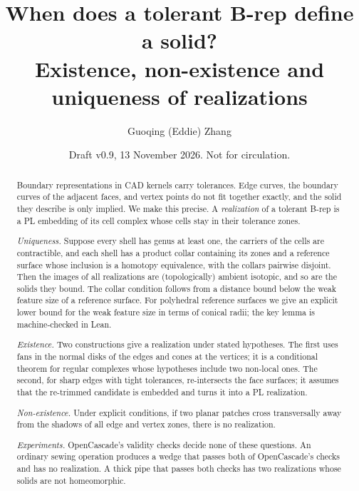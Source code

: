 \documentclass[11pt]{amsart}
\title[Realizations of tolerant B-reps]{When does a tolerant B-rep define a solid?\\
Existence, non-existence and uniqueness of realizations}
\author{Guoqing (Eddie) Zhang}
\date{Draft v0.9, 13 November 2026. Not for circulation.}
\theoremstyle{definition}
\theoremstyle{remark}
\begin{document}
\begin{abstract}
Boundary representations in CAD kernels carry tolerances. Edge curves, the boundary curves of the adjacent faces,
and vertex points do not fit together exactly, and the solid they describe is only implied. We make this precise.
A \emph{realization} of a tolerant B-rep is a PL embedding of its cell complex whose cells stay in their tolerance
zones.

\emph{Uniqueness.} Suppose every shell has genus at least one, the carriers of the cells are contractible, and each
shell has a product collar containing its zones and a reference surface whose inclusion is a homotopy equivalence,
with the collars pairwise disjoint. Then
the images of all realizations are (topologically) ambient isotopic, and so are the solids they bound. The collar condition follows
from a distance bound below the weak feature size of a reference surface. For polyhedral reference surfaces we give an explicit lower bound for the weak feature size in terms of
conical radii; the key lemma is machine-checked in Lean.

\emph{Existence.} Two constructions give a realization under stated hypotheses. The first uses fans in the normal
disks of the edges and cones at the vertices; it is a conditional theorem for regular complexes whose hypotheses include two non-local
ones. The second, for sharp edges with tight tolerances, re-intersects the face
surfaces; it assumes that the re-trimmed candidate is embedded and turns it into a PL realization.

\emph{Non-existence.} Under explicit conditions, if two planar patches cross transversally away from the shadows of
all edge and vertex zones, there is no realization.

\emph{Experiments.} OpenCascade's validity checks decide none of these questions. An ordinary sewing operation
produces a wedge that passes both of OpenCascade's checks and has no realization. A thick pipe that passes both
checks has two realizations whose solids are not homeomorphic.
\end{abstract}

\maketitle









\appendix





\end{document}
